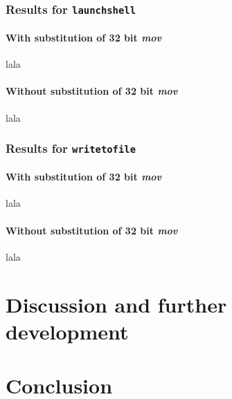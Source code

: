 \documentclass[11pt,twoside]{eitExjobb}
\begin{document}
\subsection{Results for \texttt{launchshell}}

\begin{table}[h]
\caption{Results for \texttt{launchshell}}
\label{table:resultslaunchshell}
\end{table}


\subsubsection{With substitution of 32 bit \emph{mov}}
lala
\subsubsection{Without substitution of 32 bit \emph{mov}}
lala

\subsection{Results for \texttt{writetofile}}
\subsubsection{With substitution of 32 bit \emph{mov}}
lala
\subsubsection{Without substitution of 32 bit \emph{mov}}
lala

\chapter{Discussion and further development}

\chapter{Conclusion}
{}


\end{document}
